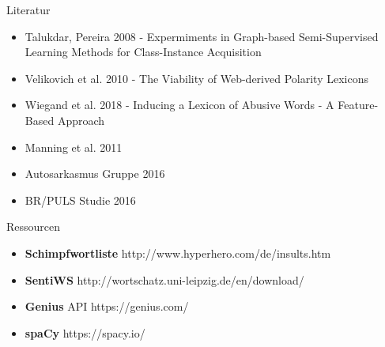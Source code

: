 \documentclass{beamer}
\begin{document}
\begin{frame}{Literatur}
\begin{itemize}
\item Talukdar, Pereira 2008 - Expermiments in Graph-based Semi-Supervised Learning Methods for Class-Instance Acquisition
\item Velikovich et al. 2010 - The Viability of Web-derived Polarity Lexicons
\item Wiegand et al. 2018 - Inducing a Lexicon of Abusive Words - A Feature-Based Approach
\item Manning et al. 2011
\item Autosarkasmus Gruppe 2016
\item BR/PULS Studie 2016
\end{itemize}
\end{frame}

\begin{frame}{Ressourcen}
\begin{itemize}
\item \textbf{Schimpfwortliste} http://www.hyperhero.com/de/insults.htm
\item \textbf{SentiWS} http://wortschatz.uni-leipzig.de/en/download/
\item \textbf{Genius} API https://genius.com/
\item \textbf{spaCy} https://spacy.io/
\end{itemize}
\end{frame}
\end{document}
